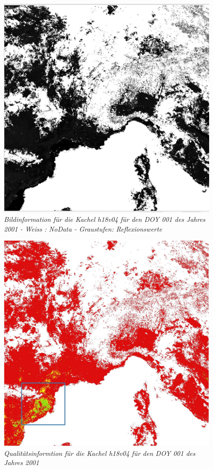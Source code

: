 \documentclass[11pt]{report}
\begin{document}
\begin{figure}[H] \label{fig:MODIS_data_jan}
\centering
\includegraphics[scale=0.4]{./Grafiken/Fitting/Fitting_durchführung/Fitting_Vergleich_Rohdaten_Qualität_full_2.JPG}
\caption{\textit{Bildinformation für die Kachel h18v04 für den DOY 001 des Jahres 2001 - Weiss : NoData - Graustufen: Reflexionswerte}}
\end{figure}
\begin{figure}[H] \label{fig:MODIS_qual_jan}
\centering
\includegraphics[scale=0.4]{./Grafiken/Fitting/Fitting_durchführung/Fitting_Vergleich_Rohdaten_Qualität_full_1.JPG}
\caption{\textit{Qualitätsinformtion für die Kachel h18v04 für den DOY 001 des Jahres 2001}}
\end{figure}
\end{document}
